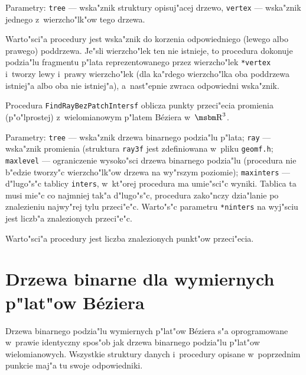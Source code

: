 Parametry: \texttt{tree} --- wska"znik struktury opisuj"acej drzewo,
\texttt{vertex} --- wska"znik jednego z~wierzcho"lk"ow tego drzewa.

Warto"sci"a procedury jest wska"znik do korzenia odpowiedniego (lewego albo
prawego) poddrzewa. Je"sli wierzcho"lek ten nie istnieje, to procedura
dokonuje podzia"lu fragmentu p"lata reprezentowanego przez wierzcho"lek
\texttt{*vertex} i~tworzy lewy i~prawy wierzcho"lek (dla ka"rdego
wierzcho"lka oba poddrzewa istniej"a albo oba nie istniej"a), a~nast"epnie
zwraca odpowiedni wska"znik.

\newpage
\begin{sloppypar}
Procedura \texttt{FindRayBezPatchIntersf} oblicza punkty przeci"ecia
promienia (p"o"lprostej) z~wielomianowym p"latem B\'{e}ziera w~$\R^3$.
\end{sloppypar}

Parametry: \texttt{tree} --- wska"znik drzewa binarnego podzia"lu p"lata;
\texttt{ray} --- wska"znik promienia (struktura \texttt{ray3f} jest
zdefiniowana w~pliku \texttt{geomf.h}; \texttt{maxlevel} --- ograniczenie
wysoko"sci drzewa binarnego podzia"lu (procedura nie b"edzie tworzy"c
wierzcho"lk"ow drzewa na wy"rszym poziomie); \texttt{maxinters} ---
d"lugo"s"c tablicy \texttt{inters}, w~kt"orej procedura ma umie"sci"c
wyniki. Tablica ta musi mie"c co najmniej tak"a d"lugo"s"c, procedura
zako"nczy dzia"lanie po znalezieniu najwy"rej tylu przeci"e"c. Warto"s"c
parametru \texttt{*ninters} na wyj"sciu jest liczb"a znalezionych
przeci"e"c.

Warto"sci"a procedury jest liczba znalezionych punkt"ow przeci"ecia.


\section{Drzewa binarne dla wymiernych p"lat"ow B\'{e}ziera}

Drzewa binarnego podzia"lu wymiernych p"lat"ow B\'{e}ziera s"a oprogramowane
w~prawie identyczny spos"ob jak drzewa binarnego podzia"lu p"lat"ow
wielomianowych. Wszystkie struktury danych i~procedury opisane w~poprzednim
punkcie maj"a tu swoje odpowiedniki.

